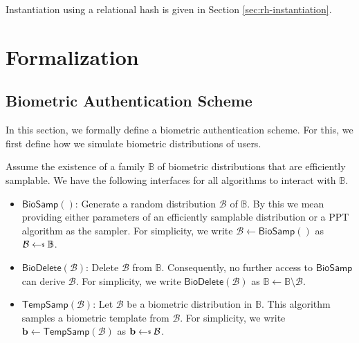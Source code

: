 Instantiation using a relational hash is given in Section \ref{sec:rh-instantiation}.




\section{Formalization}
\label{sec:formalization}

\subsection{Biometric Authentication Scheme}

In this section, we formally define a biometric authentication scheme. For this, we first define how we simulate biometric distributions of users.

Assume the existence of a family $\mathbb{B}$ of biometric distributions that are efficiently samplable. We have the following interfaces for all algorithms to interact with $\mathbb{B}$.

\begin{itemize}

	\item $\textsf{BioSamp}()$: Generate a random distribution $\mathcal{B}$ of $\mathbb{B}$. By this we mean providing either parameters of an efficiently samplable distribution or a PPT algorithm as the sampler. For simplicity, we write $\mathcal{B} \gets \textsf{BioSamp}()$ as $\mathcal{B} \getsdollar \mathbb{B}$.
	
	\item $\textsf{BioDelete}(\mathcal{B})$: Delete $\mathcal{B}$ from $\mathbb{B}$. Consequently, no further access to $\textsf{BioSamp}$ can derive $\mathcal{B}$. For simplicity, we write $\textsf{BioDelete}(\mathcal{B})$ as $\mathbb{B} \gets \mathbb{B} \setminus \mathcal{B}$.

	\item $\textsf{TempSamp}(\mathcal{B})$: Let $\mathcal{B}$ be a biometric distribution in $\mathbb{B}$. This algorithm samples a biometric template from $\mathcal{B}$. For simplicity, we write $\mathbf{b} \gets \textsf{TempSamp}(\mathcal{B})$ as $\mathbf{b} \getsdollar \mathcal{B}$.

\end{itemize}

